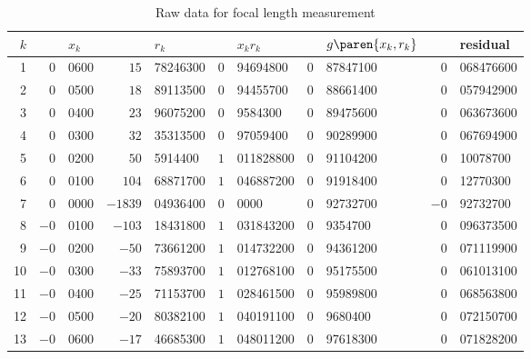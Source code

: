 \begin{table}[t]
	\begin{center}
		\begin{tabular}{rr@{.}lr@{.}lr@{.}lr@{.}lr@{.}l}
		  $k$ && $x_{k}$ && $r_{k}$ && $x_{k}r_{k}$ && $g\paren{x_{k},r_{k}}$ && residual \\\hline
1 & $0$ & 0600 & $15$ & 78246300 & $0$ & 94694800 & $0$ & 87847100 & $0$ & 068476600 \\
2 & $0$ & 0500 & $18$ & 89113500 & $0$ & 94455700 & $0$ & 88661400 & $0$ & 057942900 \\
3 & $0$ & 0400 & $23$ & 96075200 & $0$ & 9584300 & $0$ & 89475600 & $0$ & 063673600 \\
4 & $0$ & 0300 & $32$ & 35313500 & $0$ & 97059400 & $0$ & 90289900 & $0$ & 067694900 \\
5 & $0$ & 0200 & $50$ & 5914400 & $1$ & 011828800 & $0$ & 91104200 & $0$ & 10078700 \\
6 & $0$ & 0100 & $104$ & 68871700 & $1$ & 046887200 & $0$ & 91918400 & $0$ & 12770300 \\
7 & $0$ & 0000 & $-1839$ & 04936400 & $0$ & 0000 & $0$ & 92732700 & $-0$ & 92732700 \\
8 & $-0$ & 0100 & $-103$ & 18431800 & $1$ & 031843200 & $0$ & 9354700 & $0$ & 096373500 \\
9 & $-0$ & 0200 & $-50$ & 73661200 & $1$ & 014732200 & $0$ & 94361200 & $0$ & 071119900 \\
10 & $-0$ & 0300 & $-33$ & 75893700 & $1$ & 012768100 & $0$ & 95175500 & $0$ & 061013100 \\
11 & $-0$ & 0400 & $-25$ & 71153700 & $1$ & 028461500 & $0$ & 95989800 & $0$ & 068563800 \\
12 & $-0$ & 0500 & $-20$ & 80382100 & $1$ & 040191100 & $0$ & 9680400 & $0$ & 072150700 \\
13 & $-0$ & 0600 & $-17$ & 46685300 & $1$ & 048011200 & $0$ & 97618300 & $0$ & 071828200 \\[5pt]  %
		\end{tabular}
	\end{center}
	\caption{Raw data for focal length measurement}
	\label{tab:dubious data and results}
\end{table}%

\endinput  %
